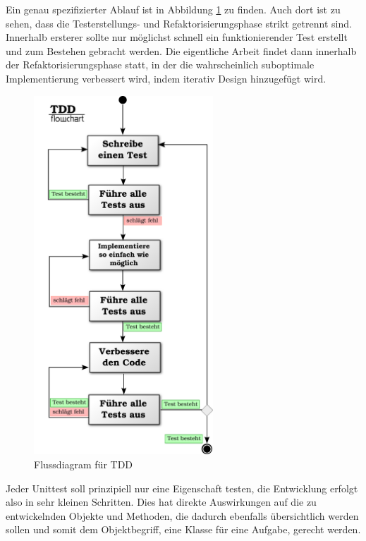   Ein genau spezifizierter Ablauf ist in Abbildung \ref{fig:tddflow} zu finden. Auch dort ist zu sehen, dass die Testerstellungs- und Refaktorisierungsphase strikt getrennt sind. Innerhalb ersterer sollte nur möglichst schnell ein funktionierender Test erstellt und zum Bestehen gebracht werden. Die eigentliche Arbeit findet dann innerhalb der Refaktorisierungsphase statt, in der die wahrscheinlich suboptimale Implementierung verbessert wird, indem iterativ Design hinzugefügt wird.
  \begin{figure}[hp]
 \centering
 \includegraphics[width=0.6\textwidth]{./diagrams/tdd-flowchart.pdf}
 \caption{Flussdiagram für TDD}
 \label{fig:tddflow}
\end{figure}


  Jeder Unittest soll prinzipiell nur eine Eigenschaft testen, die Entwicklung erfolgt also in sehr kleinen Schritten. Dies hat direkte Auswirkungen auf die zu entwickelnden Objekte und Methoden, die dadurch ebenfalls übersichtlich werden sollen und somit dem Objektbegriff, eine Klasse für eine Aufgabe, gerecht werden.

